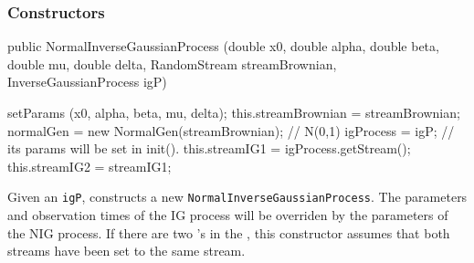 \subsubsection* {Constructors}
\begin{code}

   public NormalInverseGaussianProcess (double x0, double alpha,
                                        double beta, double mu,
                                        double delta,
                                        RandomStream streamBrownian,
                                        InverseGaussianProcess igP) \begin{hide} {
        setParams (x0, alpha, beta, mu, delta);
        this.streamBrownian = streamBrownian;
        normalGen = new NormalGen(streamBrownian); // N(0,1)
        igProcess = igP;  // its params will be set in init().
        this.streamIG1 = igProcess.getStream();
        this.streamIG2 = streamIG1;
    }\end{hide}
\end{code}
\begin{tabb} Given an  \texttt{igP}, constructs a
new \texttt{NormalInverseGaussianProcess}.  The parameters and observation
times of the IG process will be overriden by the parameters
of the NIG process.  If there are two 
's in the 
, this constructor assumes that
both streams have been set to the same stream.
\end{tabb}
